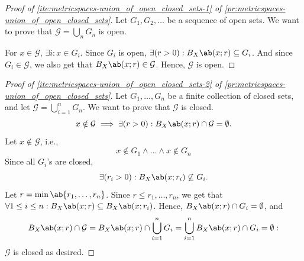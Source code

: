 \begin{proof}[Proof of \cref{ite:metricspaces-union_of_open_closed_sets-1} of \cref{pr:metricspaces-union_of_open_closed_sets}]
  Let \(G_1, G_2, \dots\) be a sequence of open sets. We want to prove that
  \(\mathcal{G} = \bigcup_n G_n\) is open.

  For \(x \in \mathcal{G}\), \(\exists i : x \in G_i\). Since \(G_i\) is open,
  \(\exists (r > 0) : \oball{X}{x}{r} \subseteq G_i\). And since \(G_i \in \mathcal{G}\),
  we also get that \(\oball{X}{x}{r} \in \mathcal{G}\). Hence, \(\mathcal{G}\) is open.
\end{proof}

\begin{proof}[Proof of \cref{ite:metricspaces-union_of_open_closed_sets-2} of \cref{pr:metricspaces-union_of_open_closed_sets}]
  Let \(G_1, \dots, G_n\) be a finite collection of closed sets, and let
  \(\mathcal{G} = \bigcup_{i=1}^n G_n\). We want to prove that \(\mathcal{G}\) is closed.
  \begin{equation}
    x \notin \mathcal{G} \implies \exists (r > 0) : \oball{X}{x}{r} \cap \mathcal{G} = \emptyset.
  \end{equation}
  Let \(x \notin \mathcal{G}\), i.e.,
  \begin{equation}
    x \notin G_1 \land \dots \land x \notin G_n
  \end{equation}
  Since all \(G_i\)'s are closed,
  \begin{equation}
    \exists (r_i > 0) : \oball{X}{x}{r_i} \not \subseteq G_i.
  \end{equation}
  Let \(r = \min\ab\{r_1, \dots, r_n\}\). Since \(r \leq r_1, \dots, r_n\), we get that
  \(\forall{1 \leq i \leq n} : \oball{X}{x}{r} \subseteq \oball{X}{x}{r_i}\). Hence,
  \(\oball{X}{x}{r} \cap G_i = \emptyset\), and
  \begin{equation}
    \oball{X}{x}{r} \cap \mathcal{G} = \oball{X}{x}{r} \cap \bigcup_{i=1}^n G_i
                                     = \bigcup_{i=1}^n \oball{X}{x}{r} \cap G_i
                                     = \emptyset:
  \end{equation}
  \(\mathcal{G}\) is closed as desired.
\end{proof}

